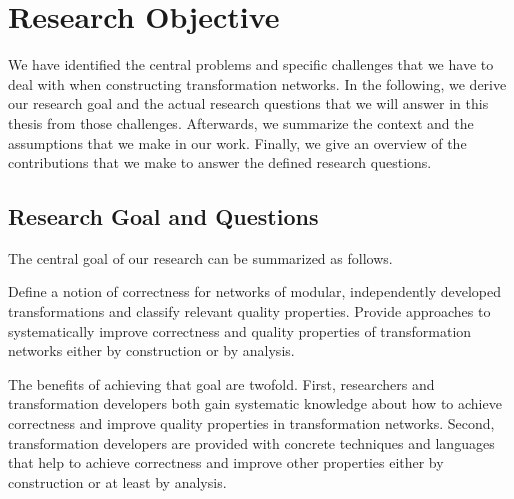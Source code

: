 \section{Research Objective}

We have identified the central problems and specific challenges that we have to deal with when constructing transformation networks.
In the following, we derive our research goal and the actual research questions that we will answer in this thesis from those challenges.
Afterwards, we summarize the context and the assumptions that we make in our work.
Finally, we give an overview of the contributions that we make to answer the defined research questions.

\subsection{Research Goal and Questions}

The central goal of our research can be summarized as follows.
\begin{researchgoal}
Define a notion of correctness for networks of modular, independently developed transformations and classify relevant quality properties.
Provide approaches to systematically improve correctness and quality properties of transformation networks either by construction or by analysis.
\end{researchgoal}

The benefits of achieving that goal are twofold.
First, researchers and transformation developers both gain systematic knowledge about how to achieve correctness and improve quality properties in transformation networks.
Second, transformation developers are provided with concrete techniques and languages that help to achieve correctness and improve other properties either by construction or at least by analysis.




